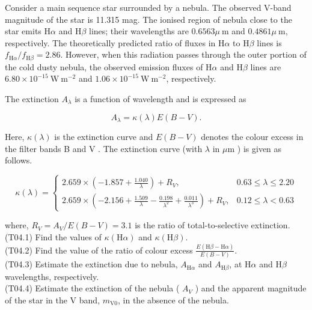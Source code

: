 \documentclass[10pt]{article}
\begin{document}
    Consider a main sequence star surrounded by a nebula. The observed V-band magnitude of the star is 11.315 mag. The ionised region of nebula close to the star emits $\mathrm{H} \alpha$ and $\mathrm{H} \beta$ lines; their wavelengths are $0.6563 \mu \mathrm{~m}$ and $0.4861 \mu \mathrm{~m}$, respectively. The theoretically predicted ratio of fluxes in $\mathrm{H} \alpha$ to $\mathrm{H} \beta$ lines is $f_{\mathrm{H} \alpha} / f_{\mathrm{H} \beta}=2.86$. However, when this radiation passes through the outer portion of the cold dusty nebula, the observed emission fluxes of $\mathrm{H} \alpha$ and $\mathrm{H} \beta$ lines are $6.80 \times 10^{-15} \mathrm{~W} \mathrm{~m}^{-2}$ and $1.06 \times 10^{-15} \mathrm{~W} \mathrm{~m}^{-2}$, respectively.

    The extinction $A_{\lambda}$ is a function of wavelength and is expressed as
    
    $$
    A_{\lambda}=\kappa(\lambda) E(B-V) .
    $$
    
    Here, $\kappa(\lambda)$ is the extinction curve and $E(B-V)$ denotes the colour excess in the filter bands B and V . The extinction curve (with $\lambda$ in $\mu \mathrm{m}$ ) is given as follows.
    
    $$
    \kappa(\lambda)= \begin{cases}2.659 \times\left(-1.857+\frac{1.040}{\lambda}\right)+R_{V}, & 0.63 \leq \lambda \leq 2.20 \\ 2.659 \times\left(-2.156+\frac{1.509}{\lambda}-\frac{0.198}{\lambda^{2}}+\frac{0.011}{\lambda^{3}}\right)+R_{V}, & 0.12 \leq \lambda<0.63\end{cases}
    $$
    
    where, $R_{V}=A_{V} / E(B-V)=3.1$ is the ratio of total-to-selective extinction.\\
    (T04.1) Find the values of $\kappa(\mathrm{H} \alpha)$ and $\kappa(\mathrm{H} \beta)$.\\
    (T04.2) Find the value of the ratio of colour excess $\frac{E(\mathrm{H} \beta-\mathrm{H} \alpha)}{E(B-V)}$.\\
    (T04.3) Estimate the extinction due to nebula, $A_{\mathrm{H} \alpha}$ and $A_{\mathrm{H} \beta}$, at $\mathrm{H} \alpha$ and $\mathrm{H} \beta$ wavelengths, respectively.\\
    (T04.4) Estimate the extinction of the nebula ( $A_{V}$ ) and the apparent magnitude of the star in the V band, $m_{\mathrm{V} 0}$, in the absence of the nebula.\\
\end{document}
